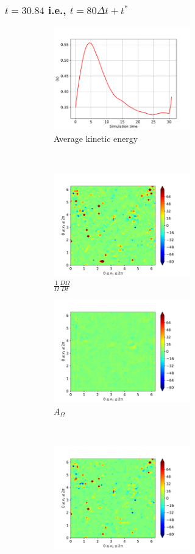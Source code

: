 \subsubsection{$t=30.84$ i.e., $t=80\Delta t + t^{\ast}$}
\begin{figure}[H]
    \begin{subfigure}[H]{0.45\textwidth}
        \includegraphics[height=1.75in]{media/run-cds-65/ke-average1400}
        \caption{Average kinetic energy}
    \end{subfigure}
    ~
    \begin{subfigure}[H]{0.45\textwidth}
        \includegraphics[height=1.75in]{media/run-cds-65/enst-1400}
        \caption{$\frac{1}{\Omega} \frac{D \Omega}{Dt}$}
    \end{subfigure}
    \newline
    \begin{subfigure}{0.45\textwidth}
        \includegraphics[height=1.75in]{media/run-cds-65/A-enst-1400}
        \caption{$A_{\Omega}$}
    \end{subfigure}
    ~
    \begin{subfigure}{0.45\textwidth}
        \includegraphics[height=1.75in]{media/run-cds-65/Pi-enst-1400}

\end{subfigure}
\end{figure}
